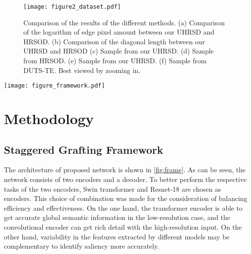 \documentclass[10pt,twocolumn,letterpaper]{article}
\begin{document}
\begin{figure}[t]

\centering
\texttt{[image: figure2\_dataset.pdf]}
\caption{Comparison of the results of the different methods. (a) Comparison of the logarithm of edge pixel amount between our UHRSD and HRSOD. (b) Comparison of the diagonal length between our UHRSD and HRSOD\cite{zeng2019towards} (c) Sample from our UHRSD. (d) Sample from HRSOD. (e) Sample from our UHRSD. (f) Sample from DUTS-TE. Best viewed by zooming in. }

\label{fig:dataset}
\end{figure}


\label{sec:dataset}




\begin{figure*}[h]
  \centering
  \texttt{[image: figure\_framework.pdf]}
  \caption{An overview of proposed Pyramid Grafting Network. Dual branches use Resnet and Swin transformer as encoder respectively. The DB$n$ is the Decoder block with $n$ input features, and the specific structure are shown on the right side. The two auxiliary supervisions are used to supervise the $RP$ and $SP$ mentioned in \cref{subsec:agl}.}
  \label{fig:frame}
\end{figure*}
\section{Methodology}

\subsection{Staggered Grafting Framework}
The architecture of proposed network is shown in \cref{fig:frame}. As can be seen, the network consists of two encoders and a decoder. To better perform the respective tasks of the two encoders, Swin transformer and Resnet-18 are chosen as encoders. This choice of combination was made for the consideration of balancing efficiency and effectiveness. On the one hand, the transformer encoder is able to get accurate global semantic information in the low-resolution case, and the convolutional encoder can get rich detail with the high-resolution input. On the other hand, variability in the features extracted by different models may be complementary to identify saliency more accurately.
\end{document}
